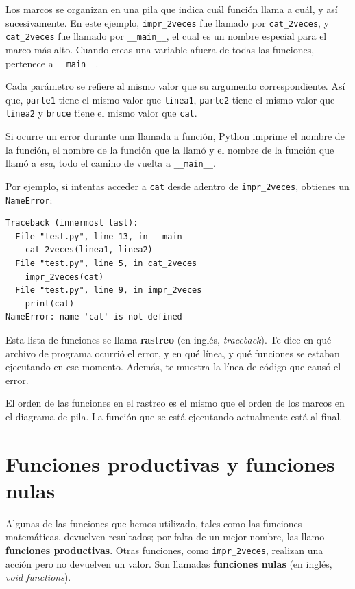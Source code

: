 \documentclass[10pt]{book}
\begin{document}
Los marcos se organizan en una pila que indica cuál función
llama a cuál, y así sucesivamente.  En este ejemplo, \verb"impr_2veces"
fue llamado por \verb"cat_2veces", y \verb"cat_2veces" fue llamado por
\verb"__main__", el cual es un nombre especial para el marco más alto.  Cuando
creas una variable afuera de todas las funciones, pertenece a
\verb"__main__".


Cada parámetro se refiere al mismo valor que su argumento
correspondiente.  Así que, {\tt parte1} tiene el mismo valor que
{\tt linea1}, {\tt parte2} tiene el mismo valor que {\tt linea2}
y {\tt bruce} tiene el mismo valor que {\tt cat}.

Si ocurre un error durante una llamada a función, Python imprime el
nombre de la función, el nombre de la función que la llamó
y el nombre de la función que llamó a {\em esa}, todo el
camino de vuelta a \verb"__main__".

Por ejemplo, si intentas acceder a {\tt cat} desde adentro de
\verb"impr_2veces", obtienes un {\tt NameError}:

\begin{verbatim}
Traceback (innermost last):
  File "test.py", line 13, in __main__
    cat_2veces(linea1, linea2)
  File "test.py", line 5, in cat_2veces
    impr_2veces(cat)
  File "test.py", line 9, in impr_2veces
    print(cat)
NameError: name 'cat' is not defined
\end{verbatim}
%
Esta lista de funciones se llama {\bf rastreo} (en inglés, {\em traceback}).  Te dice en qué
archivo de programa ocurrió el error, y en qué línea, y qué funciones
se estaban ejecutando en ese momento.  Además, te muestra la línea de código que
causó el error.

El orden de las funciones en el rastreo es el mismo que el
orden de los marcos en el diagrama de pila.  La función que se está
ejecutando actualmente está al final.


\section{Funciones productivas y funciones nulas}

Algunas de las funciones que hemos utilizado, tales como las funciones matemáticas, devuelven
resultados; por falta de un mejor nombre, las llamo {\bf funciones
  productivas}.  Otras funciones, como \verb"impr_2veces", realizan una
acción pero no devuelven un valor.  Son llamadas {\bf funciones
  nulas} (en inglés, {\em void functions}).
\end{document}
